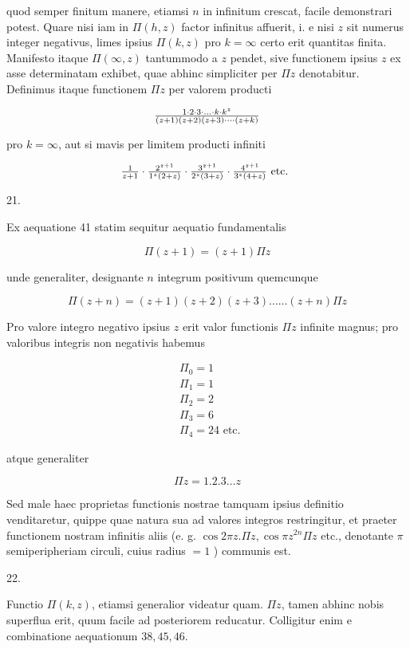 \documentclass[twoside,12pt, showframe]{memoir}
\let\oldfrac\frac
\def\frac#1#2{\mathchoice{\tfrac{#1}{#2}}{\oldfrac{#1}{#2}}{\genfrac{}{}{}{2}{#1}{#2\mathstrut}}{\genfrac{}{}{}{3}{#1}{#2\mathstrut}}}
\begin{document}
quod semper finitum manere, etiamsi \(n\) in infinitum crescat, facile demonstrari potest. Quare nisi iam in \(\Pi(h, z)\) factor infinitus affuerit, i. e nisi \(z\) sit numerus integer negativus, limes ipsius \(\Pi(k, z)\) pro \(k=\infty\) certo erit quantitas finita. Manifesto itaque \(\Pi(\infty, z)\) tantummodo a \(z\) pendet, sive functionem ipsius \(z\) ex asse determinatam exhibet, quae abhinc simpliciter per \(\Pi z\) denotabitur. Definimus itaque functionem \(\Pi z\) per valorem producti

\[
\frac{1 \cdot 2 \cdot 3 \cdot \ldots \cdot k \cdot k^{z}}{(z+1)(z+2)(z+3) \cdots \cdot(z+k)}
\]

pro \(k=\infty\), aut si mavis per limitem producti infiniti

\[
\frac{1}{z+1} \cdot \frac{2^{z+1}}{1^{z}(2+z)} \cdot \frac{3^{z+1}}{2^{z}(3+z)} \cdot \frac{4^{z+1}}{3^{z}(4+z)} \text { etc. }
\]

21.

Ex aequatione 41 statim sequitur aequatio fundamentalis

\[
\Pi(z+1)=(z+1) \Pi z
\]

unde generaliter, designante \(n\) integrum positivum quemcunque

\[
\Pi(z+n)=(z+1)(z+2)(z+3) \ldots \ldots(z+n) \Pi z
\]

Pro valore integro negativo ipsius \(z\) erit valor functionis \(\Pi z\) infinite magnus; pro valoribus integris non negativis habemus

\[
\begin{aligned}
& \Pi_{0}=1 \\
& \Pi_{1}=1 \\
& \Pi_{2}=2 \\
& \Pi_{3}=6 \\
& \Pi_{4}=24 \text { etc. }
\end{aligned}
\]

atque generaliter

\[
\Pi z=1.2 .3 \ldots z
\]

Sed male haec proprietas functionis nostrae tamquam ipsius definitio venditaretur, quippe quae natura sua ad valores integros restringitur, et praeter functionem nostram infinitis aliis (e. g. \(\cos 2 \pi z . \Pi z, \cos \pi z^{2 n} \Pi z\) etc., denotante \(\pi\) semiperipheriam circuli, cuius radius \(=1\) ) communis est.

22.

Functio \(\Pi(k, z)\), etiamsi generalior videatur quam. \(\Pi z\), tamen abhinc nobis superflua erit, quum facile ad posteriorem reducatur. Colligitur enim e combinatione aequationum \(38,45,46\).
\end{document}
